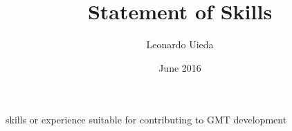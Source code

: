 \documentclass[12pt]{article}
\title{\textbf{Statement of Skills}}
\author{Leonardo Uieda}
\date{June 2016}
\begin{document}
\maketitle

skills or experience suitable for contributing to GMT development
\end{document}
